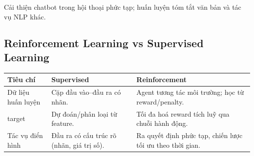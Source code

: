 \begin{ynghia}[title={Natural Language Processing}]
Cải thiện chatbot trong hội thoại phức tạp; huấn luyện tóm tắt văn bản và tác vụ NLP khác.
\end{ynghia}

\subsection{Reinforcement Learning vs Supervised Learning}

\begin{vidu}[title={So sánh ngắn}]
\begin{tabularx}{\linewidth}{>{\raggedright\arraybackslash}p{3.2cm}XX}
\textbf{Tiêu chí} & \textbf{Supervised} & \textbf{Reinforcement} \\
\midrule
Dữ liệu huấn luyện &
Cặp đầu vào--đầu ra có nhãn. &
Agent tương tác môi trường; học từ reward/penalty. \\
target &
Dự đoán/phân loại từ feature. &
Tối đa hoá reward tích luỹ qua chuỗi hành động. \\
Tác vụ điển hình &
Đầu ra có cấu trúc rõ (nhãn, giá trị số). &
Ra quyết định phức tạp, chiến lược tối ưu theo thời gian. \\
\end{tabularx}
\end{vidu}
